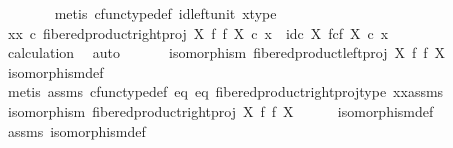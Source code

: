 \begin{isabellebody}
\ \ \ \ \ \ \isamarkupfalse%
\ {\isacharparenleft}{\kern0pt}metis\ cfunc{\isacharunderscore}{\kern0pt}type{\isacharunderscore}{\kern0pt}def\ id{\isacharunderscore}{\kern0pt}left{\isacharunderscore}{\kern0pt}unit\ x{\isacharunderscore}{\kern0pt}type{\isacharparenright}{\kern0pt}\isanewline
\ \ \ \ \isamarkupfalse%
\ \isamarkupfalse%
\ {\isachardoublequoteopen}{\isacharparenleft}{\kern0pt}xx\ {\isasymcirc}\isactrlsub c\ fibered{\isacharunderscore}{\kern0pt}product{\isacharunderscore}{\kern0pt}right{\isacharunderscore}{\kern0pt}proj\ X\ f\ f\ X{\isacharparenright}{\kern0pt}\ {\isasymcirc}\isactrlsub c\ x\ {\isacharequal}{\kern0pt}\ id\isactrlsub c\ {\isacharparenleft}{\kern0pt}X\ \isactrlbsub f\isactrlesub {\isasymtimes}\isactrlsub c\isactrlbsub f\isactrlesub \ X{\isacharparenright}{\kern0pt}\ {\isasymcirc}\isactrlsub c\ x{\isachardoublequoteclose}\isanewline
\ \ \ \ \ \ \isamarkupfalse%
\ calculation\ \isamarkupfalse%
\ auto\isanewline
\ \ \isamarkupfalse%
\isanewline
\isanewline
\ \ \isamarkupfalse%
\ {\isachardoublequoteopen}isomorphism\ {\isacharparenleft}{\kern0pt}fibered{\isacharunderscore}{\kern0pt}product{\isacharunderscore}{\kern0pt}left{\isacharunderscore}{\kern0pt}proj\ X\ f\ f\ X{\isacharparenright}{\kern0pt}{\isachardoublequoteclose}\isanewline
\ \ \ \ \isamarkupfalse%
\ isomorphism{\isacharunderscore}{\kern0pt}def\isanewline
\ \ \ \ \isamarkupfalse%
\ {\isacharparenleft}{\kern0pt}metis\ assms\ cfunc{\isacharunderscore}{\kern0pt}type{\isacharunderscore}{\kern0pt}def\ eq{}\ eq{}\ fibered{\isacharunderscore}{\kern0pt}product{\isacharunderscore}{\kern0pt}right{\isacharunderscore}{\kern0pt}proj{\isacharunderscore}{\kern0pt}type\ xx{\isacharunderscore}{\kern0pt}assms{\isacharparenleft}{\kern0pt}{}{\isacharparenright}{\kern0pt}{\isacharparenright}{\kern0pt}\isanewline
\isanewline
\ \ \isamarkupfalse%
\ \isamarkupfalse%
\ {\isachardoublequoteopen}isomorphism\ {\isacharparenleft}{\kern0pt}fibered{\isacharunderscore}{\kern0pt}product{\isacharunderscore}{\kern0pt}right{\isacharunderscore}{\kern0pt}proj\ X\ f\ f\ X{\isacharparenright}{\kern0pt}{\isachardoublequoteclose}\isanewline
\ \ \ \ \isamarkupfalse%
\ isomorphism{\isacharunderscore}{\kern0pt}def\isanewline
\ \ \ \ \isamarkupfalse%
\ assms{\isacharparenleft}{\kern0pt}{}{\isacharparenright}{\kern0pt}\ isomorphism{\isacharunderscore}{\kern0pt}def\ \isamarkupfalse%

\end{isabellebody}
